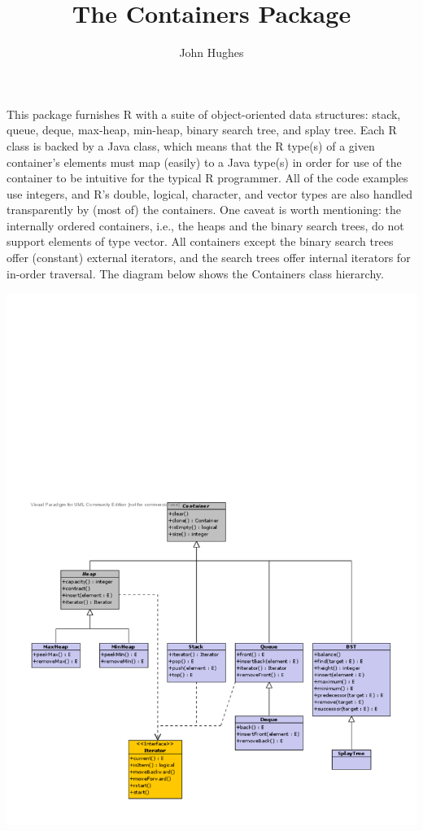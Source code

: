\documentclass[10pt]{article}
\title{The Containers Package}
\author{John Hughes}
\begin{document}
\maketitle
This package furnishes R with a suite of object-oriented data structures: stack, queue, deque, max-heap, min-heap, binary search tree, and splay tree. Each R class is backed by a Java class, which means that the R type(s) of a given container's elements must map (easily) to a Java type(s) in order for use of the container to be intuitive for the typical R programmer. All of the code examples use integers, and R's double, logical, character, and vector types are also handled transparently by (most of) the containers. One caveat is worth mentioning: the internally ordered containers, i.e., the heaps and the binary search trees, do not support elements of type vector. All containers except the binary search trees offer (constant) external iterators, and the search trees offer internal iterators for in-order traversal. The diagram below shows the Containers class hierarchy.\bigskip

\includegraphics[scale=1]{UML}
\end{document}
